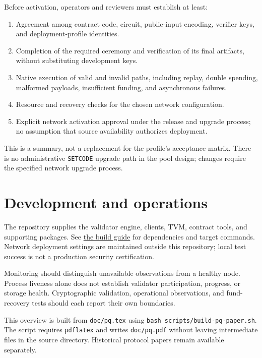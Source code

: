 \documentclass[11pt,a4paper]{article}
\newcommand{\code}[1]{\texttt{#1}}
\newcommand{\repo}[2]{\href{https://github.com/tosnetwork/tos/blob/main/#1}{#2}}
\begin{document}
Before activation, operators and reviewers must establish at least:
\begin{enumerate}
\item Agreement among contract code, circuit, public-input encoding, verifier
keys, and deployment-profile identities.
\item Completion of the required ceremony and verification of its final
artifacts, without substituting development keys.
\item Native execution of valid and invalid paths, including replay, double
spending, malformed payloads, insufficient funding, and asynchronous failures.
\item Resource and recovery checks for the chosen network configuration.
\item Explicit network activation approval under the release and upgrade
process; no assumption that source availability authorizes deployment.
\end{enumerate}
This is a summary, not a replacement for the profile's acceptance matrix.
There is no administrative \code{SETCODE} upgrade path in the pool design;
changes require the specified network upgrade process.

\section{Development and operations}
The repository supplies the validator engine, clients, TVM, contract tools,
and supporting packages. See \repo{BUILD.md}{the build guide} for dependencies
and target commands. Network deployment settings are maintained outside this repository; local
test success is not a production security certification.

Monitoring should distinguish unavailable observations from a healthy node.
Process liveness alone does not establish validator participation, progress,
or storage health. Cryptographic validation, operational observations, and
fund-recovery tests should each report their own boundaries.

This overview is built from \code{doc/pq.tex} using
\code{bash scripts/build-pq-paper.sh}. The script requires \code{pdflatex}
and writes \code{doc/pq.pdf} without leaving intermediate files in the
source directory. Historical protocol papers remain available separately.
\end{document}
